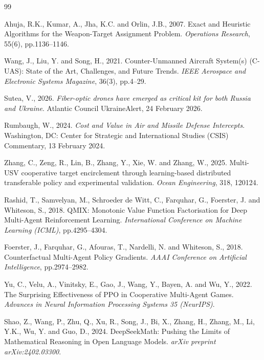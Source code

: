 \begin{thebibliography}{99}
\footnotesize
\setlength{\itemsep}{2pt}

Ahuja, R.K., Kumar, A., Jha, K.C. and Orlin, J.B., 2007.
Exact and Heuristic Algorithms for the Weapon-Target Assignment Problem.
\textit{Operations Research}, 55(6), pp.1136--1146.

Wang, J., Liu, Y. and Song, H., 2021.
Counter-Unmanned Aircraft System(s) (C-UAS): State of the Art, Challenges, and
Future Trends.
\textit{IEEE Aerospace and Electronic Systems Magazine}, 36(3), pp.4--29.

Sutea, V., 2026.
\textit{Fiber-optic drones have emerged as critical kit for both Russia and
Ukraine}. Atlantic Council UkraineAlert, 24 February 2026.

Rumbaugh, W., 2024.
\textit{Cost and Value in Air and Missile Defense Intercepts}.
Washington, DC: Center for Strategic and International Studies (CSIS) Commentary,
13 February 2024.

Zhang, C., Zeng, R., Lin, B., Zhang, Y., Xie, W. and Zhang, W., 2025.
Multi-USV cooperative target encirclement through learning-based distributed
transferable policy and experimental validation.
\textit{Ocean Engineering}, 318, 120124.

Rashid, T., Samvelyan, M., Schroeder de Witt, C., Farquhar, G., Foerster, J. and
Whiteson, S., 2018.
QMIX: Monotonic Value Function Factorisation for Deep Multi-Agent Reinforcement
Learning.
\textit{International Conference on Machine Learning (ICML)}, pp.4295--4304.

Foerster, J., Farquhar, G., Afouras, T., Nardelli, N. and Whiteson, S., 2018.
Counterfactual Multi-Agent Policy Gradients.
\textit{AAAI Conference on Artificial Intelligence}, pp.2974--2982.

Yu, C., Velu, A., Vinitsky, E., Gao, J., Wang, Y., Bayen, A. and Wu, Y., 2022.
The Surprising Effectiveness of PPO in Cooperative Multi-Agent Games.
\textit{Advances in Neural Information Processing Systems 35 (NeurIPS)}.

Shao, Z., Wang, P., Zhu, Q., Xu, R., Song, J., Bi, X., Zhang, H., Zhang, M.,
Li, Y.K., Wu, Y. and Guo, D., 2024.
DeepSeekMath: Pushing the Limits of Mathematical Reasoning in Open Language Models.
\textit{arXiv preprint arXiv:2402.03300}.


\end{thebibliography}
